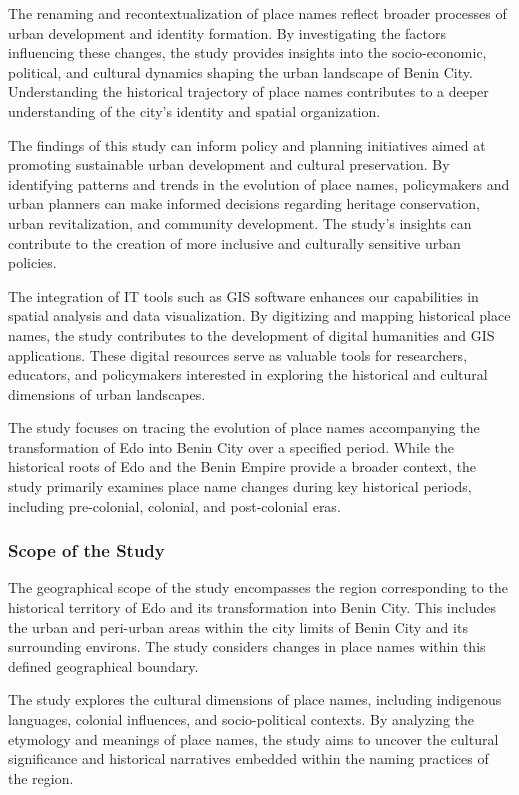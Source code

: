 The renaming and recontextualization of place names reflect broader processes of urban development and identity formation. By investigating the factors influencing these changes, the study provides insights into the socio-economic, political, and cultural dynamics shaping the urban landscape of Benin City. Understanding the historical trajectory of place names contributes to a deeper understanding of the city's identity and spatial organization.


The findings of this study can inform policy and planning initiatives aimed at promoting sustainable urban development and cultural preservation. By identifying patterns and trends in the evolution of place names, policymakers and urban planners can make informed decisions regarding heritage conservation, urban revitalization, and community development. The study's insights can contribute to the creation of more inclusive and culturally sensitive urban policies.


The integration of IT tools such as GIS software enhances our capabilities in spatial analysis and data visualization. By digitizing and mapping historical place names, the study contributes to the development of digital humanities and GIS applications. These digital resources serve as valuable tools for researchers, educators, and policymakers interested in exploring the historical and cultural dimensions of urban landscapes.


The study focuses on tracing the evolution of place names accompanying the transformation of Edo into Benin City over a specified period. While the historical roots of Edo and the Benin Empire provide a broader context, the study primarily examines place name changes during key historical periods, including pre-colonial, colonial, and post-colonial eras.
\subsubsection{Scope of the Study}
The geographical scope of the study encompasses the region corresponding to the historical territory of Edo and its transformation into Benin City. This includes the urban and peri-urban areas within the city limits of Benin City and its surrounding environs. The study considers changes in place names within this defined geographical boundary.


The study explores the cultural dimensions of place names, including indigenous languages, colonial influences, and socio-political contexts. By analyzing the etymology and meanings of place names, the study aims to uncover the cultural significance and historical narratives embedded within the naming practices of the region.


